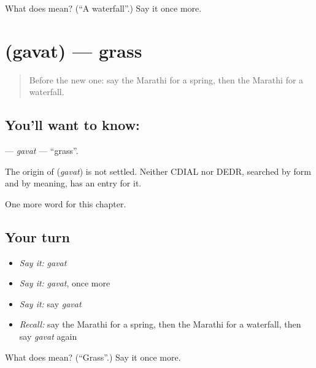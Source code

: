 \begin{tcolorbox}[breakable,colback=teal!4,colframe=teal!35!black,title={Before you move on}]
What does  mean? (\textquotedblleft{}A waterfall\textquotedblright{}.) Say it once more.
\end{tcolorbox}
\section[\texorpdfstring{\mr{गवत} (gavat)}{गवत (gavat)}]{ (gavat) — grass}

\label{lesson:MR-C139-gavat}



\begin{quote}
Before the new one: say the Marathi for a spring, then the Marathi for a waterfall.
\end{quote}

\subsection*{You'll want to know: }
\textbf{} — \emph{gavat} — \textquotedblleft{}grass\textquotedblright{}.

\begin{cousinweb}
The origin of \textbf{} (\emph{gavat}) is not settled. Neither CDIAL nor DEDR, searched by form and by meaning, has an entry for it.
\end{cousinweb}

\begin{grammarlens}[title={What you've built}]
One more word for this chapter.
\end{grammarlens}

\subsection*{Your turn}
\begin{itemize}
\raggedright
  \item \emph{Say it:} \emph{gavat}
  \item \emph{Say it:} \emph{gavat}, once more
  \item \emph{Say it:} say \emph{gavat}
  \item \emph{Recall:} say the Marathi for a spring, then the Marathi for a waterfall, then say \emph{gavat} again
\end{itemize}

\begin{tcolorbox}[breakable,colback=teal!4,colframe=teal!35!black,title={Before you move on}]
What does  mean? (\textquotedblleft{}Grass\textquotedblright{}.) Say it once more.
\end{tcolorbox}

